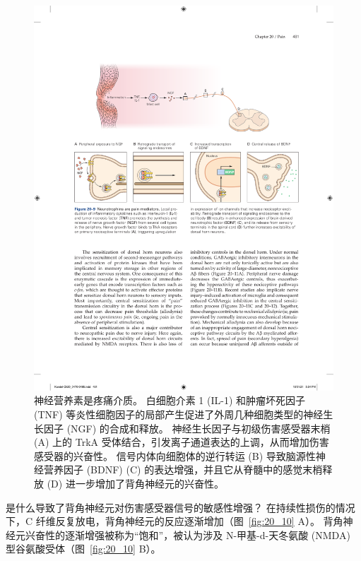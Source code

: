 \begin{figure}[htbp]
	\centering
	\includegraphics[width=0.7\linewidth]{chap20/fig_20_9}
	\caption{神经营养素是疼痛介质。
		白细胞介素 1 (IL-1) 和肿瘤坏死因子 (TNF) 等炎性细胞因子的局部产生促进了外周几种细胞类型的神经生长因子 (NGF) 的合成和释放。
		神经生长因子与初级伤害感受器末梢 (A) 上的 TrkA 受体结合，引发离子通道表达的上调，从而增加伤害感受器的兴奋性。
		信号内体向细胞体的逆行转运 (B) 导致脑源性神经营养因子 (BDNF) (C) 的表达增强，并且它从脊髓中的感觉末梢释放 (D) 进一步增加了背角神经元的兴奋性。}
	\label{fig:20_9}
\end{figure}


是什么导致了背角神经元对伤害感受器信号的敏感性增强？
在持续性损伤的情况下，C 纤维反复放电，背角神经元的反应逐渐增加（图~\ref{fig:20_10} A）。
背角神经元兴奋性的逐渐增强被称为“饱和”，被认为涉及 N-甲基-d-天冬氨酸 (NMDA) 型谷氨酸受体（图~\ref{fig:20_10} B）。


